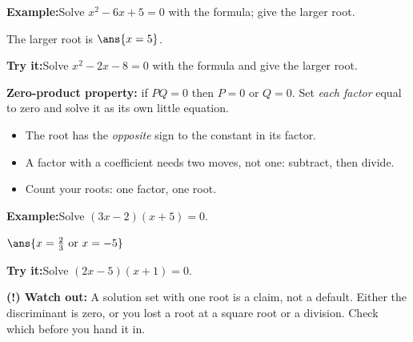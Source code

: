 \documentclass[12pt]{article}
\begin{document}
\begin{examplebox}
\textbf{Example:}\quad Solve $x^2 - 6x + 5 = 0$ with the formula; give the larger
root.

The larger root is $\ans{x = 5}$.
\end{examplebox}

\begin{tryitbox}
\textbf{Try it:}\quad Solve $x^2 - 2x - 8 = 0$ with the formula and give the
larger root.\\[2pt]
\end{tryitbox}


\begin{formulabox}
\textbf{Zero-product property:} if $PQ = 0$ then $P = 0$ or $Q = 0$. Set
\emph{each factor} equal to zero and solve it as its own little equation.
\begin{itemize}[leftmargin=0.8cm, itemsep=1pt, topsep=2pt]
  \item The root has the \emph{opposite} sign to the constant in its factor.
  \item A factor with a coefficient needs two moves, not one: subtract, then divide.
  \item Count your roots: one factor, one root.
\end{itemize}
\end{formulabox}

\begin{examplebox}
\textbf{Example:}\quad Solve $(3x - 2)(x + 5) = 0$.

$\ans{x = \tfrac{2}{3} \text{ or } x = -5}$
\end{examplebox}

\begin{tryitbox}
\textbf{Try it:}\quad Solve $(2x - 5)(x + 1) = 0$.\\[2pt]
\end{tryitbox}

\begin{watchoutbox}
\textbf{(!) Watch out:} A solution set with one root is a claim, not a default.
Either the discriminant is zero, or you lost a root at a square root or a
division. Check which before you hand it in.
\end{watchoutbox}
\end{document}
